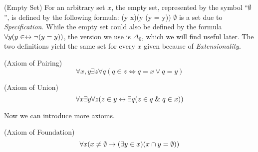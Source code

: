 \begin{definition}{(Empty Set)}\label{def:emptyset}
For an arbitrary set $x$, the empty set, represented by the symbol ``$\emptyset$'', is defined by the following formula:
\beq
(\forall y \in x)(y \in \emptyset \iff \neg(y = y))
\eeq
$\emptyset$ is a set due to \emph{Specification}. While the empty set could also be defined by the formula $\forall y (y \in \empty \iff \neg(y = y))$, the version we use is $\Delta_0$, which we will find useful later. The two definitions yield the same set for every $x$ given because of \emph{Extensionality}.
\end{definition}

\begin{definition}{(Axiom of Pairing)}\label{def:pairing}
\begin{equation}
\forall x, y \exists z \forall q (q \in z \iff q = x \lor q = y) %
\end{equation}
\end{definition}

\begin{definition}{(Axiom of Union)}\label{def:union}
\begin{equation}
\forall x \exists y \forall z (z \in y \iff \exists q( z \in q \et q \in x)) %
\end{equation}
\end{definition}

%

Now we can introduce more axioms.
\begin{definition}{(Axiom of Foundation)}\label{def:foundation}
\begin{equation}
\forall x (x \neq \emptyset \then (\exists y \in x) (x \cap y = \emptyset)) %
\end{equation}
\end{definition}

